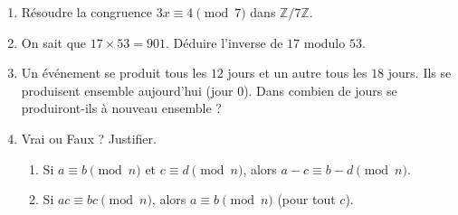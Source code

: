 \documentclass[11pt]{article}
\begin{document}
\begin{exercice}
\begin{enumerate}
    \item Résoudre la congruence $3x \equiv 4 \pmod{7}$ dans $\mathbb{Z}/7\mathbb{Z}$.
    \item On sait que $17 \times 53 = 901$. Déduire l'inverse de $17$ modulo $53$.
    \item Un événement se produit tous les $12$ jours et un autre tous les $18$ jours. Ils se produisent ensemble aujourd'hui (jour $0$). Dans combien de jours se produiront-ils à nouveau ensemble ?
    \item Vrai ou Faux ? Justifier.
    \begin{enumerate}
        \item Si $a \equiv b \pmod{n}$ et $c \equiv d \pmod{n}$, alors $a-c \equiv b-d \pmod{n}$.
        \item Si $ac \equiv bc \pmod{n}$, alors $a \equiv b \pmod{n}$ (pour tout $c$).
    \end{enumerate}
\end{enumerate}
\end{exercice}
\end{document}
